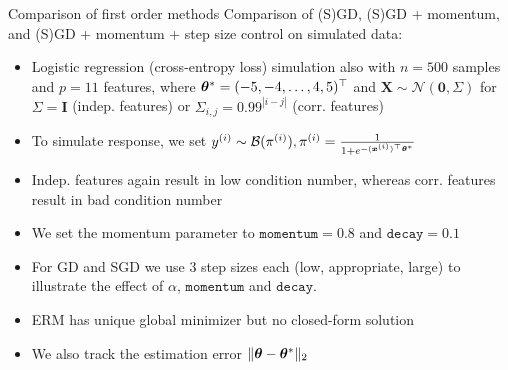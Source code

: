 \documentclass[11pt,compress,t,notes=noshow, xcolor=table]{beamer}
\begin{document}
\begin{vbframe}{Comparison of first order methods}
Comparison of (S)GD, (S)GD + momentum, and (S)GD + momentum + step size control on simulated data:

\begin{itemize}
    \item Logistic regression (cross-entropy loss) simulation also with $n=500$ samples and $p=11$ features, where $\bm{\theta}^{\ast}=(-5,-4,\ldots,4,5)^{\top}$ and $\bm{X} \sim \mathcal{N}(\bm{0}, \Sigma)$ for $\Sigma=\bm{I}$ (indep. features) or $\Sigma_{i,j}=0.99^{|i-j|}$ (corr. features)
    \item To simulate response, we set $y^{(i)} \sim \mathcal{B}(\pi^{(i)}), \pi^{(i)} = \frac{1}{1+e^{-(\bm{x}^{(i)})^{\top}\bm{\theta}^{\ast}}}$
    \item Indep. features again result in low condition number, whereas corr. features result in bad condition number
    \item We set the momentum parameter to $\texttt{momentum}=0.8$ and $\texttt{decay}=0.1$
    \item For GD and SGD we use 3 step sizes each (low, appropriate, large) to illustrate the effect of $\alpha$, $\texttt{momentum}$ and $\texttt{decay}$.
    \item ERM has unique global minimizer but no closed-form solution
    \item We also track the estimation error $\Vert \bm{\theta} - \bm{\theta}^{\ast} \Vert_2$
\end{itemize}

\end{vbframe}

\end{document}

